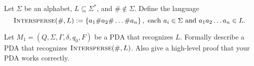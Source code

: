 \begin{problem}
  Let $\Sigma$ be an alphabet, $L \subseteq \Sigma^*$,
  and $\# \notin \Sigma$.
  Define the language
  \[ 
    \textsc{Intersperse}(\#, L) := 
    \left\{a_1 \# a_2 \# \ldots \# a_n\right\},
    \text{ each $a_i \in \Sigma$ and $a_1a_2 \ldots a_n \in L$}.
  \]

  \step
  Let $M_1 = (Q, \Sigma, \Gamma, \delta, q_0, F)$ be a PDA
  that recognizes $L$.
  Formally describe a PDA that recognizes $\textsc{Intersperse}(\#, L)$.
  Also give a high-level proof that your PDA works correctly.
\end{problem}
